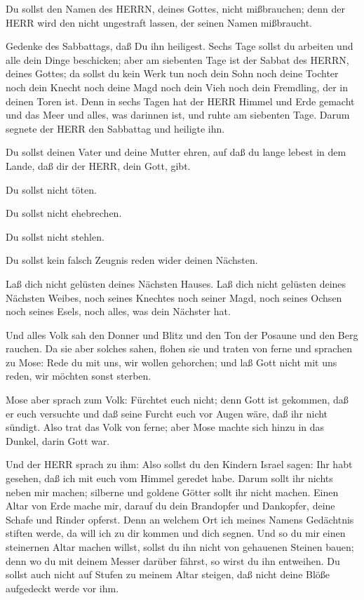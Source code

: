  Du sollst den Namen des HERRN, deines Gottes, nicht
mißbrauchen; denn der HERR wird den nicht ungestraft lassen, der seinen
Namen mißbraucht.

 Gedenke des Sabbattags, daß Du ihn heiligest. 
Sechs Tage sollst du arbeiten und alle dein Dinge beschicken;
 aber am siebenten Tage ist der Sabbat des HERRN, deines
Gottes; da sollst du kein Werk tun noch dein Sohn noch deine Tochter
noch dein Knecht noch deine Magd noch dein Vieh noch dein Fremdling, der
in deinen Toren ist.  Denn in sechs Tagen hat der HERR
Himmel und Erde gemacht und das Meer und alles, was darinnen ist, und
ruhte am siebenten Tage. Darum segnete der HERR den Sabbattag und
heiligte ihn.

 Du sollst deinen Vater und deine Mutter ehren, auf daß du
lange lebest in dem Lande, daß dir der HERR, dein Gott, gibt.

 Du sollst nicht töten.

 Du sollst nicht ehebrechen.

 Du sollst nicht stehlen.

 Du sollst kein falsch Zeugnis reden wider deinen Nächsten.

 Laß dich nicht gelüsten deines Nächsten Hauses. Laß dich
nicht gelüsten deines Nächsten Weibes, noch seines Knechtes noch seiner
Magd, noch seines Ochsen noch seines Esels, noch alles, was dein
Nächster hat.

 Und alles Volk sah den Donner und Blitz und den Ton der
Posaune und den Berg rauchen. Da sie aber solches sahen, flohen sie und
traten von ferne  und sprachen zu Mose: Rede du mit uns,
wir wollen gehorchen; und laß Gott nicht mit uns reden, wir möchten
sonst sterben.

 Mose aber sprach zum Volk: Fürchtet euch nicht; denn Gott
ist gekommen, daß er euch versuchte und daß seine Furcht euch vor Augen
wäre, daß ihr nicht sündigt.  Also trat das Volk von ferne;
aber Mose machte sich hinzu in das Dunkel, darin Gott war.

 Und der HERR sprach zu ihm: Also sollst du den Kindern
Israel sagen: Ihr habt gesehen, daß ich mit euch vom Himmel geredet
habe.  Darum sollt ihr nichts neben mir machen; silberne
und goldene Götter sollt ihr nicht machen.  Einen Altar von
Erde mache mir, darauf du dein Brandopfer und Dankopfer, deine Schafe
und Rinder opferst. Denn an welchem Ort ich meines Namens Gedächtnis
stiften werde, da will ich zu dir kommen und dich segnen. 
Und so du mir einen steinernen Altar machen willst, sollst du ihn nicht
von gehauenen Steinen bauen; denn wo du mit deinem Messer darüber
fährst, so wirst du ihn entweihen.  Du sollst auch nicht
auf Stufen zu meinem Altar steigen, daß nicht deine Blöße aufgedeckt
werde vor ihm.

